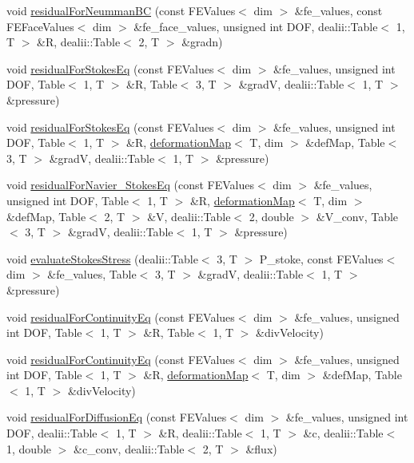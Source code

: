 \begin{DoxyCompactItemize}
\item 
void \hyperlink{class_residual_a4c8fd158c8034b25780abfe785755baa}{residual\-For\-Neumman\-B\-C} (const F\-E\-Values$<$ dim $>$ \&fe\-\_\-values, const F\-E\-Face\-Values$<$ dim $>$ \&fe\-\_\-face\-\_\-values, unsigned int D\-O\-F, dealii\-::\-Table$<$ 1, T $>$ \&R, dealii\-::\-Table$<$ 2, T $>$ \&gradn)
\item 
void \hyperlink{class_residual_a9a8f493fb66e0bd394948af13a27d821}{residual\-For\-Stokes\-Eq} (const F\-E\-Values$<$ dim $>$ \&fe\-\_\-values, unsigned int D\-O\-F, Table$<$ 1, T $>$ \&R, Table$<$ 3, T $>$ \&grad\-V, dealii\-::\-Table$<$ 1, T $>$ \&pressure)
\item 
void \hyperlink{class_residual_a95ad863ab9066d2dbfef9db3907a911f}{residual\-For\-Stokes\-Eq} (const F\-E\-Values$<$ dim $>$ \&fe\-\_\-values, unsigned int D\-O\-F, Table$<$ 1, T $>$ \&R, \hyperlink{structdeformation_map}{deformation\-Map}$<$ T, dim $>$ \&def\-Map, Table$<$ 3, T $>$ \&grad\-V, dealii\-::\-Table$<$ 1, T $>$ \&pressure)
\item 
void \hyperlink{class_residual_a34f1f680e957e21ac47c35f404e9fd6a}{residual\-For\-Navier\-\_\-\-Stokes\-Eq} (const F\-E\-Values$<$ dim $>$ \&fe\-\_\-values, unsigned int D\-O\-F, Table$<$ 1, T $>$ \&R, \hyperlink{structdeformation_map}{deformation\-Map}$<$ T, dim $>$ \&def\-Map, Table$<$ 2, T $>$ \&V, dealii\-::\-Table$<$ 2, double $>$ \&V\-\_\-conv, Table$<$ 3, T $>$ \&grad\-V, dealii\-::\-Table$<$ 1, T $>$ \&pressure)
\item 
void \hyperlink{class_residual_a7e33928364e99df9a42db58752aca7f3}{evaluate\-Stokes\-Stress} (dealii\-::\-Table$<$ 3, T $>$ P\-\_\-stoke, const F\-E\-Values$<$ dim $>$ \&fe\-\_\-values, Table$<$ 3, T $>$ \&grad\-V, dealii\-::\-Table$<$ 1, T $>$ \&pressure)
\item 
void \hyperlink{class_residual_a882f4595a6547599cfe8f65897f45896}{residual\-For\-Continuity\-Eq} (const F\-E\-Values$<$ dim $>$ \&fe\-\_\-values, unsigned int D\-O\-F, Table$<$ 1, T $>$ \&R, Table$<$ 1, T $>$ \&div\-Velocity)
\item 
void \hyperlink{class_residual_afddbdda003424f242266894fdd1f7b1a}{residual\-For\-Continuity\-Eq} (const F\-E\-Values$<$ dim $>$ \&fe\-\_\-values, unsigned int D\-O\-F, Table$<$ 1, T $>$ \&R, \hyperlink{structdeformation_map}{deformation\-Map}$<$ T, dim $>$ \&def\-Map, Table$<$ 1, T $>$ \&div\-Velocity)
\item 
void \hyperlink{class_residual_a224462af849f5a1927bc90eb3795f2f2}{residual\-For\-Diffusion\-Eq} (const F\-E\-Values$<$ dim $>$ \&fe\-\_\-values, unsigned int D\-O\-F, dealii\-::\-Table$<$ 1, T $>$ \&R, dealii\-::\-Table$<$ 1, T $>$ \&c, dealii\-::\-Table$<$ 1, double $>$ \&c\-\_\-conv, dealii\-::\-Table$<$ 2, T $>$ \&flux)

\end{DoxyCompactItemize}
